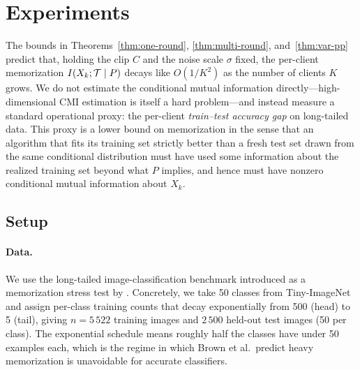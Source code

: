 \section{Experiments}\label{sec:experiments}

The bounds in Theorems~\ref{thm:one-round}, \ref{thm:multi-round}, and~\ref{thm:var-pp} predict that, holding the clip \(C\) and the noise scale \(\sigma\) fixed, the per-client memorization \(I(X_k;\mathcal{T}\mid P)\) decays like \(O(1/K^2)\) as the number of clients \(K\) grows. We do not estimate the conditional mutual information directly---high-dimensional CMI estimation is itself a hard problem---and instead measure a standard operational proxy: the per-client \emph{train--test accuracy gap} on long-tailed data. This proxy is a lower bound on memorization in the sense that an algorithm that fits its training set strictly better than a fresh test set drawn from the same conditional distribution must have used some information about the realized training set beyond what \(P\) implies, and hence must have nonzero conditional mutual information about \(X_k\).

\subsection{Setup}\label{sec:exp-setup}

\paragraph{Data.} We use the long-tailed image-classification benchmark introduced as a memorization stress test by \citet{Brown2021Memorization}. Concretely, we take 50 classes from Tiny-ImageNet \citep{Le2015TinyImageNet} and assign per-class training counts that decay exponentially from 500 (head) to 5 (tail), giving \(n=5\,522\) training images and \(2\,500\) held-out test images (50 per class). The exponential schedule means roughly half the classes have under 50 examples each, which is the regime in which Brown et al.\ predict heavy memorization is unavoidable for accurate classifiers.

